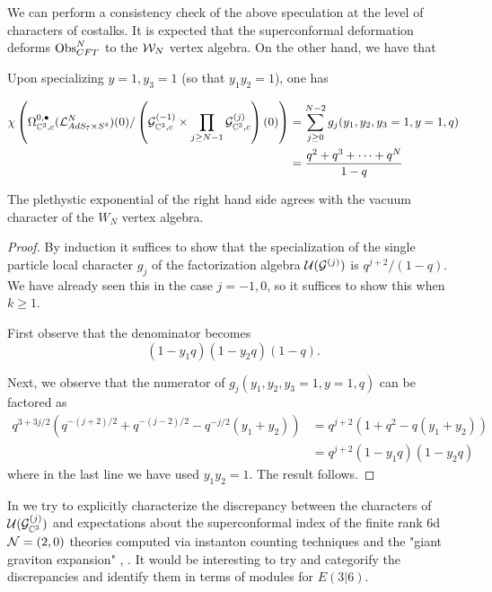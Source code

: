 We can perform a consistency check of the above speculation at the level of characters of costalks. It is expected that the superconformal deformation deforms $\text{Obs}^N_{CFT}$ to the $\mathcal{W}_N$ vertex algebra. On the other hand, we have that 


\begin{prop}
Upon specializing $y=1,y_3=1$ (so that $y_1 y_2 = 1$), one has 

\begin{align*}
\chi \left ( \Omega^{0,\bullet}_{\mathbb{C}^3,c} (\mathcal{L}^N_{AdS_7\times S^4})(0)/ \left ( \mathcal{G}^{(-1)}_{\mathbb{C}^3,c}\times \prod _{j\geq {N-1}} \mathcal{G}^{(j)}_{\mathbb{C}^3,c}\right )(0)\right ) & = \sum_{j \geq 0}^{N-2} g_j (y_1,y_2, y_3=1,y=1,q) \\
& = \frac{q^2 + q^3 + \cdots + q^{N}}{1-q} 
\end{align*}

The plethystic exponential of the right hand side agrees with the vacuum character of the $W_{N}$ vertex algebra.
\end{prop}
\begin{proof}
By induction it suffices to show that the specialization of the single particle local character $g_j$ of the factorization algebra $\mathcal{U}(\mathcal{G}^{(j)})$ is $q^{j+2} / (1-q)$. 
We have already seen this in the case $j=-1,0$, so it suffices to show this when $k \geq 1$.

First observe that the denominator becomes
\begin{equation}
(1-y_1 q)(1-y_2q) (1-q) .
\end{equation}

Next, we observe that the numerator of $g_j (y_1,y_2,y_3=1,y=1,q)$ can be factored as
\begin{align*}
q^{3 + 3j/2} \left(q^{-(j+2)/2} + q^{-(j-2)/2} - q^{-j/2} (y_1+y_2) \right) 
& = q^{j+2} (1 + q^2 - q (y_1 + y_2)) \\
& = q^{j+2} (1 - y_1 q) (1-y_2 q) 
\end{align*}
where in the last line we have used $y_1 y_2 = 1$.
The result follows.
\end{proof}

\parsec{}
In \cite{raghavendran2022holographic} we try to explicitly characterize the discrepancy between the characters of $\mathcal{U} (\mathcal{G}^{(j)}_{\mathbb{C}^3})$ and expectations about the superconformal index of the finite rank 6d $\mathcal{N}=(2,0)$ theories computed via instanton counting techniques \cite{Kim:2013nva} and the "giant graviton expansion" \cite{Arai_2020,}, \cite{Imamura}. It would be interesting to try and categorify the discrepancies and identify them in terms of modules for $E(3|6)$.


